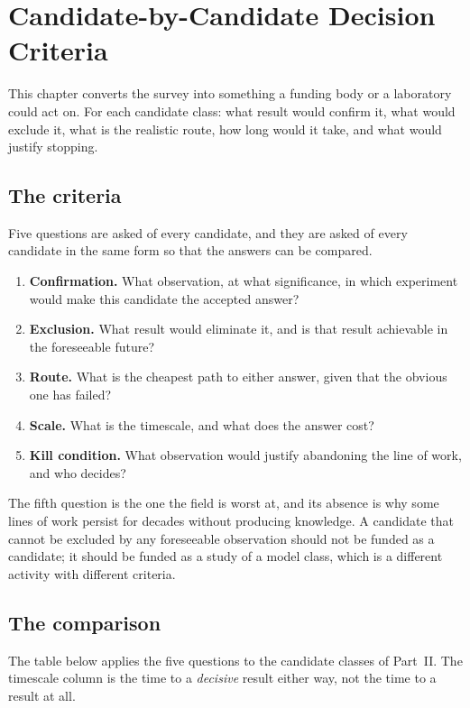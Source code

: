 
\chapter{Candidate-by-Candidate Decision Criteria}
\label{ch:criteria}

This chapter converts the survey into something a funding body or a
laboratory could act on. For each candidate class: what result would
confirm it, what would exclude it, what is the realistic route, how long
would it take, and what would justify stopping.

\section{The criteria}Five questions are asked of every candidate, and they are
asked of every candidate in the same form so that the answers can be
compared.

\begin{enumerate}
\item \textbf{Confirmation.} What observation, at what significance, in
which experiment would make this candidate the accepted answer?
\item \textbf{Exclusion.} What result would eliminate it, and is that
result achievable in the foreseeable future?
\item \textbf{Route.} What is the cheapest path to either answer, given
that the obvious one has failed?
\item \textbf{Scale.} What is the timescale, and what does the answer cost?
\item \textbf{Kill condition.} What observation would justify abandoning the
line of work, and who decides?
\end{enumerate}

The fifth question is the one the field is worst at, and its absence is why
some lines of work persist for decades without producing knowledge. A
candidate that cannot be excluded by any foreseeable observation should not
be funded as a candidate; it should be funded as a study of a model class,
which is a different activity with different criteria.

\section{The comparison}The table below applies the five questions to the
candidate classes of Part~II. The timescale column is the time to a
\emph{decisive} result either way, not the time to a result at all.


